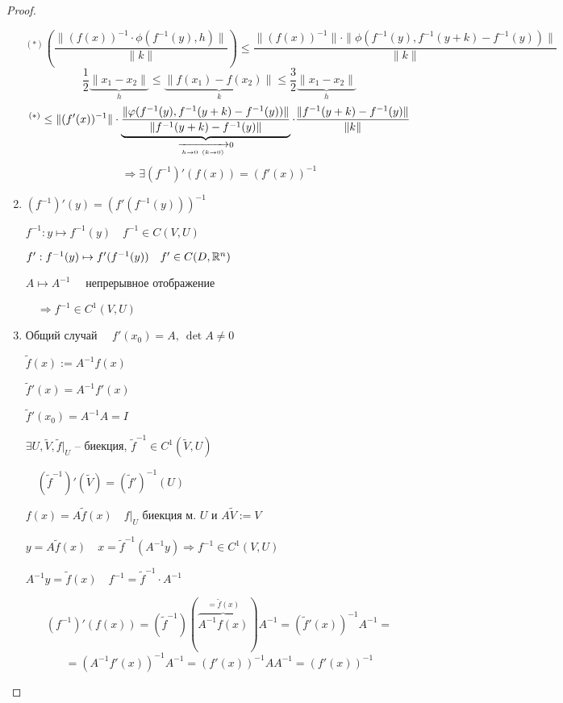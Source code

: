 \begin{proof}
\begin{enumerate}
\[                \]
                \[
                    ^{(*)}\left(\frac{\|(f(x))^{-1} \cdot \phi(f^{-1}(y), h)\|}{\|k\|}\right) \le \frac{\|\left(f(x)\right)^{-1}\| \cdot \|\phi(f^{-1}(y), f^{-1}(y + k) - f^{-1}(y))\|}{\|k\|}    
                \]
                \[
                    \frac12\underbrace{\|x_1 - x_2\|}_{h} \le \underbrace{\|f(x_1) - f(x_2)\|}_{k} \le \frac32\underbrace{\|x_1 - x_2\|}_{h}   
                \]
                \[
                    ^{(*)} \le \|(f'(x))^{-1}\| \cdot \underbrace{\frac{\|\phi(f^{-1}(y), f^{-1}(y + k) - f^{-1}(y))\|}{\|f^{-1}(y + k) - f^{-1}(y)\|}}_{\xrightarrow[h \rightarrow 0 \newline (k \rightarrow 0)]{} 0} \cdot \frac{\|f^{-1}(y+k) - f^{-1}(y)\|}{\|k\|}
                \]
                \[
                    \Rightarrow \exists (f^{-1})'(f(x)) = (f'(x))^{-1}    
                \]
            \item $\left(f^{-1}\right)'(y) = \left(f'(f^{-1}(y))\right)^{-1}$
                \par $f^{-1} : y \mapsto f^{-1}(y) \quad f^{-1} \in C(V, U)$
                \par $f' : f^{-1}(y) \mapsto f'(f^{-1}(y)) \quad f' \in C(D, \mathbb{R}^n)$
                \par $A \mapsto A^{-1} \quad$ непрерывное отображение
                \par $\quad \Rightarrow f^{-1} \in C^1(V, U)$
            \item Общий случай $\quad f'(x_0) = A, \ \det A \not= 0$
                \par $\tilde f(x) := A^{-1}f(x)$
                \par $\tilde f'(x) = A^{-1}f'(x)$
                \par $\tilde f'(x_0) = A^{-1}A = I$
                \par $\exists U, \tilde V, \tilde f\big|_U$ -- биекция, $\tilde f^{-1} \in C^1(\tilde V, U)$
                \par $\quad (\tilde f^{-1})' (\tilde V) = (\tilde f')^{-1}(U)$
                \par $f(x) = A \tilde f(x) \quad f\big|_U$ биекция м. $U$ и $A \tilde V := V$
                \par $y = A \tilde f(x) \quad x = \tilde f^{-1}(A^{-1} y) \Rightarrow f^{-1} \in C^1(V, U)$
                \par $A^{-1}y = \tilde f(x) \quad f^{-1} = \tilde f^{-1} \cdot A^{-1}$
                
                \[
                    (f^{-1})'(f(x)) = (\tilde f^{-1})(\overbrace{A^{-1}f(x)}^{=\tilde f(x)}) A^{-1} = (\tilde f'(x))^{-1} A^{-1} =
                \]
                \[
                    = (A^{-1} f'(x))^{-1}A^{-1} = (f'(x))^{-1} AA^{-1} = (f'(x))^{-1}    
                \]
        \end{enumerate}
    \end{proof}

